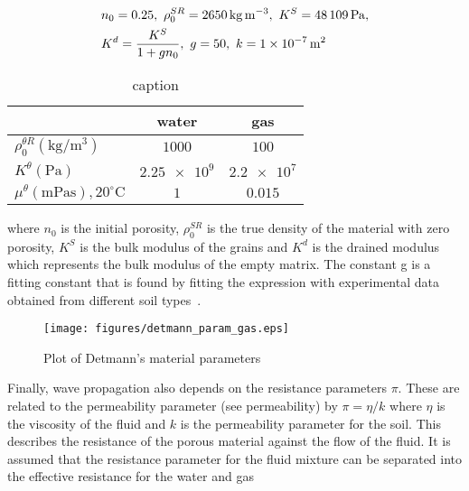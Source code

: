 \documentclass[twocolumn]{article}
\newcommand{\otoprule}{\midrule[\heavyrulewidth]}
\begin{document}
\begin{align} \label{eq:skeleton-properties}
     & n_0 = \num{0.25},~\rho_0^{SR} = \SI{2650}{\kilo\gram\per\cubic\metre},~K^S = \SI{48109}{\pascal}, \\
     & K^d = \frac{K^S}{1 + gn_0},~g = \num{50},~k = \SI{1d-7}{\square\metre}
\end{align}

\begin{table}
    \caption{caption}
    \label{t:material-properties}
    \centering
    \begin{tabular}{lcc}
        \toprule
                                                                     & water          & gas           \\\otoprule
        $\rho_0^{\theta{R}}(\si{\kg\per\cubic\m})$                   & $\num{1000}$   & $\num{100}$   \\
        $K^\theta (\si{\pascal})$                                    & $\num{2.25e9}$ & $\num{2.2e7}$ \\
        $\mu^\theta (\si{\milli\pascal\second}), 20^\circ\textrm{C}$ & $\num{1}$      & $\num{0.015}$ \\
        \bottomrule
    \end{tabular}
\end{table}

where $n_0$ is the initial porosity, $\rho_0^{SR}$ is the true density of the material with zero porosity, $K^S$ is the bulk modulus of the grains and $K^d$ is the drained modulus which represents the bulk modulus of the empty matrix. The constant g is a fitting constant that is found by fitting the expression with experimental data obtained from different soil types~\cite{white_1983}.

\begin{figure}
    \centering
    \texttt{[image: figures/detmann\_param\_gas.eps]}
    \caption{Plot of Detmann's material parameters}
    \label{fig:detmann_param_gas}
\end{figure}

Finally, wave propagation also depends on the resistance parameters $\pi$. These are related to the permeability parameter (see permeability) by $\pi = \eta/k$ where $\eta$ is the viscosity of the fluid and $k$ is the permeability parameter for the soil. This describes the resistance of the porous material against the flow of the fluid. It is assumed that the resistance parameter for the fluid mixture can be separated into the effective resistance for the water and gas
\end{document}

